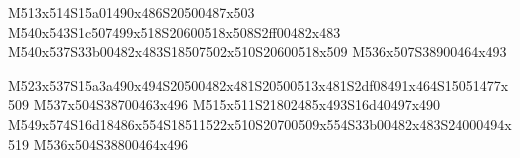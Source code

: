 \documentclass{article}
\begin{document}
\begin{multicols}{5}
\begin{center}
M513x514S15a01490x486S20500487x503 %
M540x543S1c507499x518S20600518x508S2ff00482x483 %
M540x537S33b00482x483S18507502x510S20600518x509 %
M536x507S38900464x493 %

M523x537S15a3a490x494S20500482x481S20500513x481S2df08491x464S15051477x509 %
M537x504S38700463x496 %
M515x511S21802485x493S16d40497x490 %
M549x574S16d18486x554S18511522x510S20700509x554S33b00482x483S24000494x519 %
M536x504S38800464x496 %

\end{center}
\end{multicols}
\end{document}
